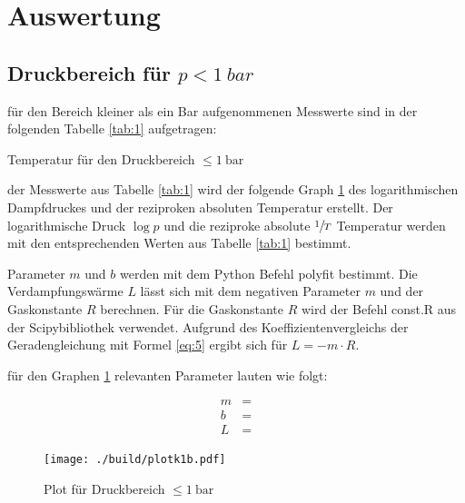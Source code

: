 \section{Auswertung}

\subsection{Druckbereich für $p < \SI{1}{bar}$}

\justifying für den Bereich kleiner als ein Bar aufgenommenen Messwerte sind in der folgenden Tabelle \ref{tab:1} aufgetragen:

\begin{table}
    \centering
    
    \caption{Temperatur für den Druckbereich $\leq \SI{1}{\bar}$}
    \label{tab:1}
\end{table}

\justifying der Messwerte aus Tabelle \ref{tab:1} wird der folgende Graph \ref{fig:4} des logarithmischen Dampfdruckes und
der reziproken absoluten Temperatur erstellt. Der logarithmische Druck $\log{p}$ und die reziproke absolute $\sfrac{1}{T}$ 
Temperatur werden mit den entsprechenden Werten aus Tabelle \ref{tab:1} bestimmt.
\newpage

\justifying Parameter $m$ und $b$ werden mit dem Python Befehl polyfit \cite{uncertainties} bestimmt. Die Verdampfungswärme $L$ lässt sich mit dem 
negativen Parameter $m$ und der Gaskonstante $R$ berechnen. Für die Gaskonstante $R$ wird der Befehl const.R aus der Scipybibliothek \cite{scipy} verwendet.
Aufgrund des Koeffizientenvergleichs der Geradengleichung mit Formel \eqref{eq:5} ergibt sich für $L = -m \cdot R$.

\justifying für den Graphen \ref{fig:4} relevanten Parameter lauten wie folgt:

\begin{subequations} \label{eq:7}
\begin{align}
    m &= \text{} \label{eq:7a}\\
    b &= \text{} \label{eq:7b}\\
    L &= \text{} \label{eq:7c}
\end{align}
\end{subequations}

\begin{figure}[H]
    \centering
    \texttt{[image: ./build/plotk1b.pdf]}
    \caption{Plot für Druckbereich $\leq \SI{1}{\bar}$}
    \label{fig:4}
\end{figure}

